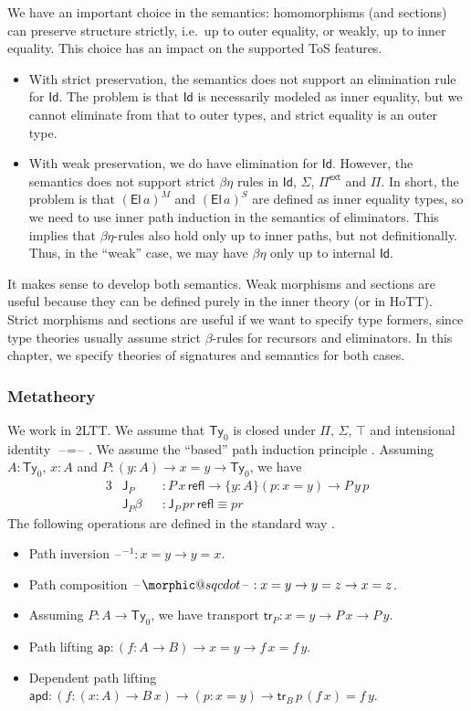 \documentclass[12pt,a4paper,twoside,openany]{book}
\makeatletter
\DeclareRobustCommand{\sqcdot}{\mathbin{\mathpalette\morphic@sqcdot\relax}}
\newcommand{\morphic@sqcdot}[2]{%
  \sbox\z@{$\m@th#1\centerdot$}%
  \ht\z@=.33333\ht\z@
  \vcenter{\box\z@}%
}
\theoremstyle{remark}
\theoremstyle{definition}
\theoremstyle{theorem}
\newcommand{\mi}[1]{\mathit{#1}}
\newcommand{\ms}[1]{\mathsf{#1}}
\newcommand{\ap}{\ms{ap}}
\newcommand{\apd}{\ms{apd}}
\newcommand{\tr}{\ms{tr}}
\newcommand{\J}{\ms{J}}
\newcommand{\refl}{\mathsf{refl}}
\newcommand{\Ty}{\mathsf{Ty}}
\newcommand{\El}{\mathsf{El}}
\newcommand{\Id}{\mathsf{Id}}
\newcommand{\blank}{\mathord{\hspace{1pt}\text{--}\hspace{1pt}}}
\newcommand{\Piinf}{\Pi^{\mathsf{ext}}}
\makeatother
\begin{document}
We have an important choice in the semantics: homomorphisms (and sections) can
preserve structure strictly, i.e.\ up to outer equality, or weakly, up to inner
equality. This choice has an impact on the supported ToS features.
\begin{itemize}
\item
  With strict preservation, the semantics does not support an elimination
  rule for $\Id$. The problem is that $\Id$ is necessarily modeled as inner
  equality, but we cannot eliminate from that to outer types, and strict
  equality is an outer type.
\item
  With weak preservation, we do have elimination for $\Id$. However, the
  semantics does not support strict $\beta\eta$ rules in $\Id$, $\Sigma$,
  $\Piinf$ and $\Pi$.  In short, the problem is that $(\El\,a)^M$ and
  $(\El\,a)^S$ are defined as inner equality types, so we need to use inner path
  induction in the semantics of eliminators. This implies that $\beta\eta$-rules
  also hold only up to inner paths, but not definitionally. Thus, in the
  ``weak'' case, we may have $\beta\eta$ only up to internal $\Id$.
\end{itemize}
It makes sense to develop both semantics. Weak morphisms and sections are
useful because they can be defined purely in the inner theory (or in HoTT). Strict
morphisms and sections are useful if we want to specify type formers, since type
theories usually assume strict $\beta$-rules for recursors and eliminators. In
this chapter, we specify theories of signatures and semantics for both cases.

\subsubsection{Metatheory}

We work in 2LTT. We assume that $\Ty_0$ is closed under $\Pi$, $\Sigma$, $\top$
and intensional identity $\blank\!=\!\blank$. We assume the ``based'' path induction principle
\cite[Section~1.12.1]{hottbook}. Assuming $A : \Ty_0$, $x : A$ and $P : (y : A) \to x = y \to \Ty_0$,
we have
\begin{alignat*}{3}
  & \J_P      &&: P\,x\,\refl \to \{y : A\}(p : x = y) \to P\,y\,p\\
  & \J_P\beta &&: \J_P\,\mi{pr}\,\refl \equiv \mi{pr}
\end{alignat*}
The following operations are defined in the standard way
\cite[Section~2]{hottbook}.
\begin{itemize}
  \item Path inversion $\blank^{-1} : x = y \to y = x$.
  \item Path composition $\blank\!\sqcdot\!\blank : x = y \to y = z \to x = z$.
  \item Assuming $P : A \to \Ty_0$, we have transport $\tr_P : x = y \to P\,x \to P\,y$.
  \item Path lifting $\ap : (f : A \to B) \to x = y \to f\,x = f\,y$.
  \item Dependent path lifting $\apd : (f : (x : A) \to B\,x) \to (p : x = y) \to \tr_B\,p\,(f\,x) = f\,y$.
\end{itemize}
\end{document}

